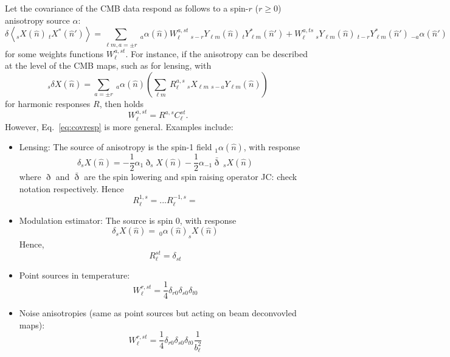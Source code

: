 \documentclass{article}
\newcommand{\Ylm}[1]{\:_{#1}Y_{\ell m}}
\newcommand{\av}[1]{\left\langle #1 \right\rangle}
\newcommand{\JC}[1]{\color{red}JC: #1\color{black}}
\newcommand{\hn}[0]{\hat n}
\begin{document}
Let the covariance of the CMB data respond as follows to a spin-$r$  ($r \ge 0$) anisotropy source $\alpha$:
\begin{equation}\label{eq:covresp}
	\delta  \av{_sX(\hn) \:_tX^*(\hn')} =   \sum_{\ell m, a = \pm r}\:_{a}\alpha(\hn) W_\ell^{a, st} \:_{s - r}Y_{\ell m}(\hn)  \:_{t}Y^*_{\ell m}(\hn')  +   W_\ell^{a, ts} \:_{s}Y_{\ell m}(\hn)  \:_{t-r}Y^*_{\ell m}(\hn')\:_{-a}\alpha(\hn')
\end{equation}
for some weights functions $W_\ell^{a, st}$. For instance, if the anisotropy can be described at the level of the CMB maps, such as for lensing, with
\begin{equation}
	_{s}\delta X(\hn) = \sum_{a = \pm r}\:_{a}\alpha(\hn) \left( \sum_{\ell m}\: R_\ell^{a, s} \:_sX_{\ell m} \Ylm {s- a}(\hn)\right)
\end{equation}
for harmonic responses $R$, then holds
\begin{equation}
	W_\ell^{a, st} = R^{a, s} C_\ell^{st}.
\end{equation}
However, Eq.~\eqref{eq:covresp} is more general.
Examples include:
\begin{itemize}
	\item Lensing: The source of anisotropy is the spin-1 field $_1\alpha(\hn)$, with response
	\begin{equation}
		\delta _sX(\hn) =  -\frac 12 \alpha_1 \eth _{s}X(\hn) - \frac 12 \alpha_{-1} \bar \eth \:_sX(\hn) 
	\end{equation}
	where $\eth$ and $\bar \eth$ are the spin lowering and spin raising operator \JC{check notation } respectively. Hence
	\begin{equation}
		R_\ell^{1, s} =  ... R_\ell^{-1, s} =
	\end{equation}
	\item Modulation estimator: The source is spin 0, with response
	\begin{equation}
	\delta _sX(\hn) = \:_0\alpha(\hn) _{s}X(\hn)	
	\end{equation}
	Hence,
	\begin{equation}
		R_\ell^{st} = \delta_{st}
	\end{equation}
	\item Point sources in temperature:
	\begin{equation}
	W^{r, st}_\ell = \frac 14\delta_{r0}\delta_{s0}\delta_{t0} 
	\end{equation}
	\item Noise anisotropies (same as point sources but acting on beam deconvovled maps):
	\begin{equation}
	W^{r, st}_\ell = \frac 14\delta_{r0}\delta_{s0}\delta_{t0}  \frac{1}{b_\ell^2}
	\end{equation}
\end{itemize}
\end{document}
